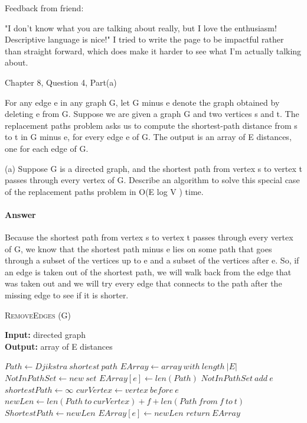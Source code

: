 \documentclass{article}
\begin{document}
Feedback from friend:

"I don't know what you are talking about really, but I love the enthusiasm! Descriptive language is nice!" I tried to write the page to be impactful rather than straight forward, which does make it harder to see what I'm actually talking about.

\collab{\todo{}}

Chapter 8, Question 4, Part(a)

For any edge e in any graph G, let G minus e denote the graph obtained by
deleting e from G. Suppose we are given a graph G and two vertices s
and t. The replacement paths problem asks us to compute the shortest-path
distance from s to t in G minus e, for every edge e of G. The output is an array
of E distances, one for each edge of G.

(a) Suppose G is a directed graph, and the shortest path from vertex s to
vertex t passes through every vertex of G. Describe an algorithm to solve
this special case of the replacement paths problem in O(E log V ) time.

\paragraph{Answer}
Because the shortest path from vertex s to vertex t passes through every vertex
of G, we know that the shortest path minus e lies on some path that goes through
a subset of the vertices up to e and a subset of the vertices after e. So, if
an edge is taken out of the shortest path, we will walk back from the edge that was
taken out and we will try every edge that connects to the path after the missing
edge to see if it is shorter.

\begin{algorithm} \caption{\textsc{RemoveEdges} (G)}\label{alg:seb}
    {\bf Input:} directed graph\\
    {\bf Output:} array of E distances
    \begin{algorithmic}[1]
        \State$Path \gets Djikstra\ shortest\ path$
        \State$EArray \gets array\ with\ length\ |E|$
        \State$NotInPathSet \gets new\ set$
                \State$EArray[e] \gets len(Path)$
            \Else{}
                \State$NotInPathSet\ add\ e$
            \EndIf{}
        \EndFor{}
            \State$shortestPath \gets \infty$
            \State$curVertex \gets vertex\ before\ e$
            \State$newLen \gets len(Path\ to\ curVertex) + f + len(Path\ from\ f\ to\ t) $
                \State$ShortestPath \gets newLen$
                \EndIf{}
                \State$EArray[e] \gets newLen$
            \EndFor{}
        \EndFor{}
        \State$return\ EArray$
    \end{algorithmic}
\end{algorithm}
\end{document}
